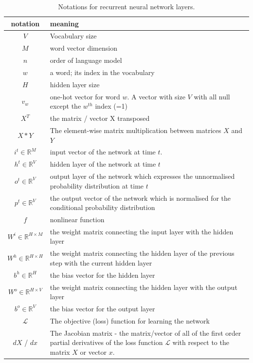 \begin{table}
	\centering
	\begin{tabular}{|c|p{10cm}|}
		\hline
		notation & meaning \\
		\hline
		$V$ & Vocabulary size \\
		$M$ & word vector dimension \\
		$n$ & order of language model \\
		$w$ & a word; its index in the vocabulary \\
		$H$ & hidden layer size \\
		$v_w$ & one-hot vector for word $w$. A vector with size $V$ with all null except the $w^{th}$ index (=1) \\
		$X^T$ & the matrix / vector X transposed \\
		$X * Y$ & The element-wise matrix multiplication between matrices $X$ and $Y$\\
		\hline
		$i^t \in \mathbb{R}^{M}$ & input vector of the network at time $t$. \\
		$h^t \in \mathbb{R}^{V}$ & hidden layer of the network at time $t$ \\
		$o^t \in \mathbb{R}^{V}$ & output layer of the network which expresses the \newline unnormalised probability distribution at time $t$\\
		$p^t \in \mathbb{R}^{V}$ & the output vector of the network which is normalised for the \newline conditional probability distribution \\
		$f$ & nonlinear function \\
		$W^i \in \mathbb{R}^{H \times M}$ & the weight matrix connecting \newline the input layer with the hidden layer \\
		$W^h \in \mathbb{R}^{H \times H}$ & the weight matrix connecting the hidden layer of the previous step \newline  with the current hidden layer \\
		$b^h \in \mathbb{R}^H$ & the bias vector for the hidden layer \\
		\hline 
		$W^o \in \mathbb{R}^{H \times V}$ & the weight matrix connecting \newline the hidden layer with the output layer \\
		$b^o \in \mathbb{R}^V$ & the bias vector for the output layer \\
		\hline
		\hline
		$\mathcal{L}$ & The objective (loss) function for learning the network \\
		$dX$ / $dx$ & The Jacobian matrix - the matrix/vector of all of the first order partial derivatives of the loss function $\mathcal{L}$ with respect to the matrix $X$ or vector $x$. \\
		\hline
	\end{tabular}
	\label{tab:notationRec}
	\caption{Notations for recurrent neural network layers.}
\end{table}



